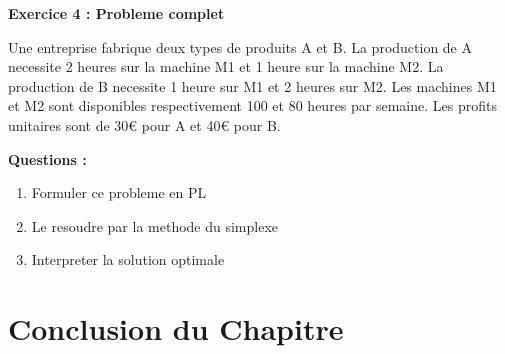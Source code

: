 \documentclass[12pt,a4paper]{article}
\begin{document}
\begin{exemple}
\textbf{Exercice 4 : Probleme complet}

Une entreprise fabrique deux types de produits A et B. La production de A necessite 2 heures sur la machine M1 et 1 heure sur la machine M2. La production de B necessite 1 heure sur M1 et 2 heures sur M2. Les machines M1 et M2 sont disponibles respectivement 100 et 80 heures par semaine. Les profits unitaires sont de 30€ pour A et 40€ pour B.

\textbf{Questions :}
\begin{enumerate}
    \item Formuler ce probleme en PL
    \item Le resoudre par la methode du simplexe
    \item Interpreter la solution optimale
\end{enumerate}
\end{exemple}

\newpage
\section{Conclusion du Chapitre}
\end{document}

